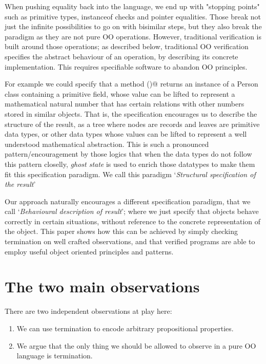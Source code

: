 \documentclass[runningheads]{llncs}
\begin{document}

When pushing equality back into the language, we end up with "stopping points" such as primitive types, instanceof checks and pointer equalities.
Those break not just the infinite possibilities to go on with bisimilar steps, but they also break the paradigm as they are not pure OO operations.
However, traditional verification is built around those operations; as described below,  traditional OO verification specifies the abstract behaviour of an operation, by describing its concrete implementation. This requires specifiable software to abandon OO principles.


For example we could specify that a method \Q@getOldestPerson()@ returns an instance of a Person class containing a primitive \Q@int@ field, whose value can be lifted to represent a mathematical natural number that has certain relations with other numbers stored in similar objects. That is, the specification encourages us to describe the structure of the result, as a tree where nodes are records and leaves are primitive data types, or other data types whose values can be lifted to represent a well understood mathematical abstraction.
This is such a pronounced pattern/encouragement by those logics that when the data types do not follow this pattern closelly, \emph{ghost state} is used to enrich those datatypes to make them fit this specification paradigm.
We call this paradigm `\emph{Structural specification of the result}'

Our approach naturally encourages a different specification paradigm, that we call 
`\emph{Behavioural description of result}'; where we just specify that objects behave correctly in certain situations, without reference to the concrete representation of the object.
This paper shows how this can be achieved by simply checking termination on well crafted observations, and that verified programs are able to employ useful object oriented principles and patterns.
\section{The two main observations}
There are two independent observations at play here:
\begin{enumerate}
\item We can use termination to encode arbitrary propositional properties.
\item We argue that the only thing we should be allowed to observe in a pure OO language is termination.
\end{enumerate}
\end{document}
